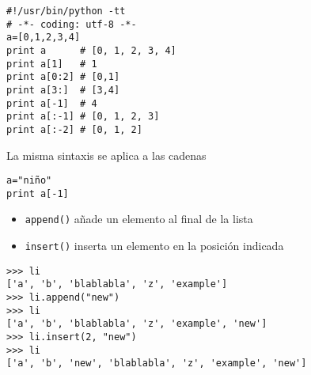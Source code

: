 \documentclass[ucs]{beamer}
\begin{document}
\begin{frame}[fragile]
  \begin{scriptsize}
\begin{verbatim}
#!/usr/bin/python -tt
# -*- coding: utf-8 -*-
a=[0,1,2,3,4]
print a      # [0, 1, 2, 3, 4]
print a[1]   # 1 
print a[0:2] # [0,1]
print a[3:]  # [3,4]
print a[-1]  # 4
print a[:-1] # [0, 1, 2, 3]
print a[:-2] # [0, 1, 2]
\end{verbatim}
  \end{scriptsize}
  \begin{center}
La misma sintaxis se aplica a las cadenas
  \end{center}

  \begin{scriptsize}
\begin{verbatim}
a="niño"
print a[-1]
\end{verbatim}
  \end{scriptsize}

\end{frame}



\begin{frame}[fragile]

\begin{itemize}
\item \verb|append()| añade un elemento al final de la lista
\item \verb|insert()| inserta un elemento en la posición indicada
\end{itemize}  

\begin{scriptsize}
\begin{verbatim}
>>> li
['a', 'b', 'blablabla', 'z', 'example']
>>> li.append("new")               
>>> li
['a', 'b', 'blablabla', 'z', 'example', 'new']
>>> li.insert(2, "new")           
>>> li
['a', 'b', 'new', 'blablabla', 'z', 'example', 'new']
\end{verbatim}
\end{scriptsize}


\end{frame}


\end{document}
